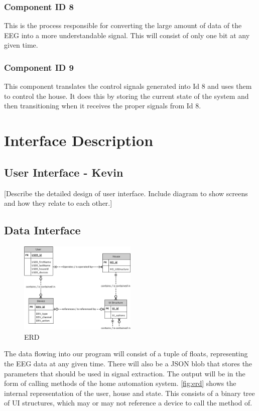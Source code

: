 \documentclass{article}
\begin{document}
\subsubsection{Component ID 8}
This is the process responsible for converting the large amount of data of the EEG into a more understandable signal. This will consist of only one bit at any given time.

\subsubsection{Component ID 9}
This component translates the control signals generated into Id 8 and uses them to control the house. It does this by storing the current state of the system and then transitioning when it receives the proper signals from Id 8.
\newpage

\section{Interface Description}

\subsection{User Interface - Kevin}

[Describe the detailed design of user interface.  Include diagram to show screens and how they relate to each other.]

\subsection{Data Interface}
\begin{figure}[h!]

  \centering
    \includegraphics[width=0.5\textwidth]{ERD}
   \caption{ERD}
   	\label{fig:erd}
\end{figure}

The data flowing into our program will consist of a tuple of floats,
representing the EEG data at any given time. There will also be a JSON blob
that stores the parameters that should be used in signal extraction. The
output will be in the form of calling methods of the home automation system.
\autoref{fig:erd} shows the internal representation of the user, house and
state. This consists of a binary tree of UI structures, which may or may not
reference a device to call the method of.
\end{document}
